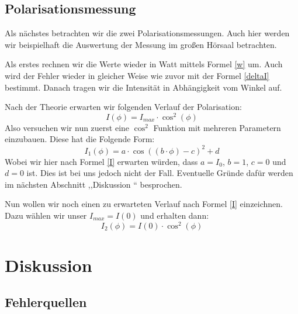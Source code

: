 \documentclass[titlepage,11pt,a4paper,ngerman]{article}
\begin{document}
\subsection{Polarisationsmessung}

Als nächstes betrachten wir die zwei Polarisationsmessungen. Auch hier werden wir beispielhaft die Auswertung der Messung im großen Hörsaal betrachten. \par 
Als erstes rechnen wir die Werte wieder in Watt mittels Formel \eqref{w} um. Auch wird der Fehler wieder in gleicher Weise wie zuvor mit der Formel \eqref{deltaI} bestimmt. Danach tragen wir die Intensität in Abhängigkeit vom Winkel auf. \par 
Nach der Theorie erwarten wir folgenden Verlauf der Polarisation:
\begin{equation}
I(\phi) = I_{max}\cdot \cos^{2}(\phi)
\label{I}
\end{equation}
Also versuchen wir nun zuerst eine $\cos^{2}$ Funktion mit mehreren Parametern einzubauen. Diese hat die Folgende Form: 
\begin{equation}
I_{1}(\phi) = a \cdot \cos((b \cdot\phi) - c)^{2} + d
\label{I1}
\end{equation}
Wobei wir hier nach Formel \eqref{I} erwarten würden, dass $a=I_{0}$, $b=1$, $c=0$ und $d=0$ ist. Dies ist bei uns jedoch nicht der Fall. Eventuelle Gründe dafür werden im nächsten Abschnitt ,,Diskussion `` besprochen. \par 
Nun wollen wir noch einen zu erwarteten Verlauf nach Formel \eqref{I} einzeichnen. Dazu wählen wir unser $I_{max}=I(0)$ und erhalten dann:
\begin{equation}
I_{2}(\phi) = I(0)\cdot \cos^{2}(\phi)
\label{I2}
\end{equation}


\section{Diskussion}

\subsection{Fehlerquellen}
\end{document}
